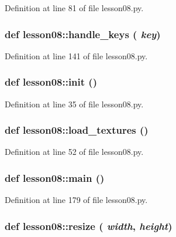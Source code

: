 Definition at line 81 of file lesson08.py.
\subsubsection{\setlength{\rightskip}{0pt plus 5cm}def lesson08::handle\_\-keys ( {\em key})}\label{namespacelesson08_42fbbeef5dc6c3873814dd38048f476c}




Definition at line 141 of file lesson08.py.
\subsubsection{\setlength{\rightskip}{0pt plus 5cm}def lesson08::init ()}\label{namespacelesson08_a6ce5e9aff6b8ee3ad2c4207d907a3dd}




Definition at line 35 of file lesson08.py.
\subsubsection{\setlength{\rightskip}{0pt plus 5cm}def lesson08::load\_\-textures ()}\label{namespacelesson08_8f7090c2eeaa4ce9ee04909238e1cc4f}




Definition at line 52 of file lesson08.py.
\subsubsection{\setlength{\rightskip}{0pt plus 5cm}def lesson08::main ()}\label{namespacelesson08_0e237c52aba1696d470bf6eb6d7beec5}




Definition at line 179 of file lesson08.py.
\subsubsection{\setlength{\rightskip}{0pt plus 5cm}def lesson08::resize ( {\em width},  {\em height})}\label{namespacelesson08_7096104329c69dd4f347ef75750f4616}




